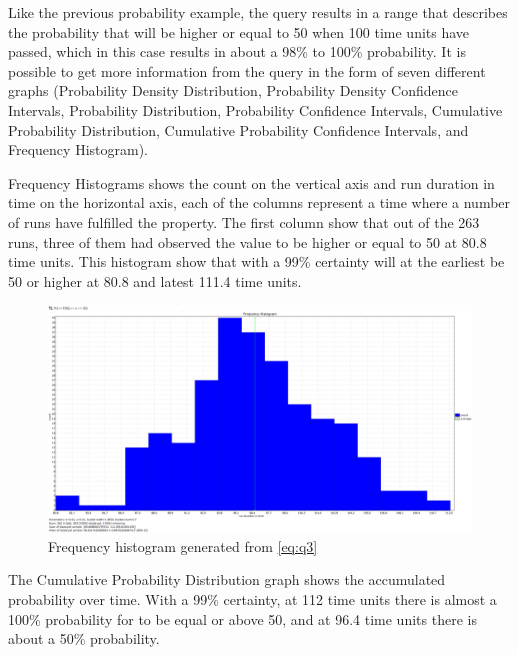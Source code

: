 Like the previous probability example, the query results in a range that describes the probability that  will be higher or equal to 50 when 100 time units have passed, which in this case results in about a 98\% to 100\% probability.
It is possible to get more information from the query in the form of seven different graphs (Probability Density Distribution, Probability Density Confidence Intervals, Probability Distribution, Probability Confidence Intervals, Cumulative Probability Distribution, Cumulative Probability Confidence Intervals, and Frequency Histogram). 

Frequency Histograms shows the count on the vertical axis and run duration in time on the horizontal axis, each of the columns represent a time where a number of runs have fulfilled the property.
The first column show that out of the 263 runs, three of them had observed the value  to be higher or equal to 50 at 80.8 time units.
This histogram show that with a 99\% certainty  will at the earliest be 50 or higher at 80.8 and latest 111.4 time units.

\begin{figure}[!h]
	\includegraphics[width=\textwidth]{graphics/eq3fh.png}
	\caption{Frequency histogram generated from \cref{eq:q3}}
	\label{fig:eq3fh}
\end{figure}

The Cumulative Probability Distribution graph shows the accumulated probability over time.
With a 99\% certainty, at 112 time units there is almost a 100\% probability for  to be equal or above 50, and at 96.4 time units there is about a 50\% probability.

